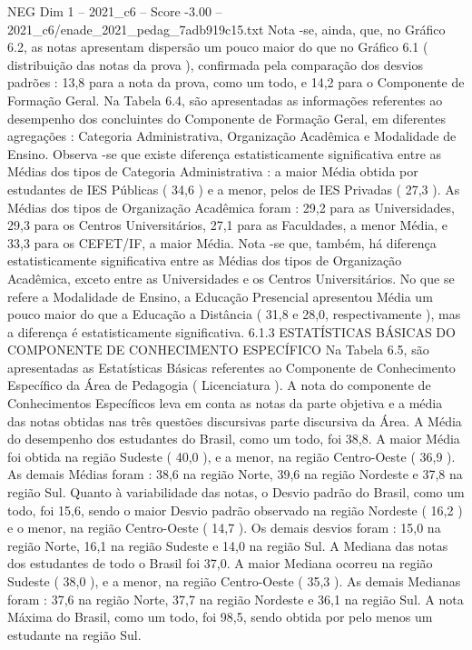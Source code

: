 \begin{textsample}{NEG Dim 1 – 2021\_c6 – Score -3.00 – 2021\_c6/enade\_2021\_pedag\_7adb919c15.txt}
Nota -se, ainda, que, no Gráfico 6.2, as notas apresentam dispersão um pouco maior do que no Gráfico 6.1 ( distribuição das notas da prova ), confirmada pela comparação dos desvios padrões : 13,8 para a nota da prova, como um todo, e 14,2 para o Componente de Formação Geral.
Na Tabela 6.4, são apresentadas as informações referentes ao desempenho dos concluintes do Componente de Formação Geral, em diferentes agregações : Categoria Administrativa, Organização Acadêmica e Modalidade de Ensino.
Observa -se que existe diferença estatisticamente significativa entre as Médias dos tipos de Categoria Administrativa : a maior Média obtida por estudantes de IES Públicas ( 34,6 ) e a menor, pelos de IES Privadas ( 27,3 ).
As Médias dos tipos de Organização Acadêmica foram : 29,2 para as Universidades, 29,3 para os Centros Universitários, 27,1 para as Faculdades, a menor Média, e 33,3 para os CEFET/IF, a maior Média.
Nota -se que, também, há diferença estatisticamente significativa entre as Médias dos tipos de Organização Acadêmica, exceto entre as Universidades e os Centros Universitários.
No que se refere a Modalidade de Ensino, a Educação Presencial apresentou Média um pouco maior do que a Educação a Distância ( 31,8 e 28,0, respectivamente ), mas a diferença é estatisticamente significativa. 6.1.3 ESTATÍSTICAS BÁSICAS DO COMPONENTE DE CONHECIMENTO ESPECÍFICO Na Tabela 6.5, são apresentadas as Estatísticas Básicas referentes ao Componente de Conhecimento Específico da Área de Pedagogia ( Licenciatura ).
A nota do componente de Conhecimentos Específicos leva em conta as notas da parte objetiva e a média das notas obtidas nas três questões discursivas parte discursiva da Área.
A Média do desempenho dos estudantes do Brasil, como um todo, foi 38,8.
A maior Média foi obtida na região Sudeste ( 40,0 ), e a menor, na região Centro-Oeste ( 36,9 ).
As demais Médias foram : 38,6 na região Norte, 39,6 na região Nordeste e 37,8 na região Sul.
Quanto à variabilidade das notas, o Desvio padrão do Brasil, como um todo, foi 15,6, sendo o maior Desvio padrão observado na região Nordeste ( 16,2 ) e o menor, na região Centro-Oeste ( 14,7 ).
Os demais desvios foram : 15,0 na região Norte, 16,1 na região Sudeste e 14,0 na região Sul.
A Mediana das notas dos estudantes de todo o Brasil foi 37,0.
A maior Mediana ocorreu na região Sudeste ( 38,0 ), e a menor, na região Centro-Oeste ( 35,3 ).
As demais Medianas foram : 37,6 na região Norte, 37,7 na região Nordeste e 36,1 na região Sul.
A nota Máxima do Brasil, como um todo, foi 98,5, sendo obtida por pelo menos um estudante na região Sul.

\end{textsample}
